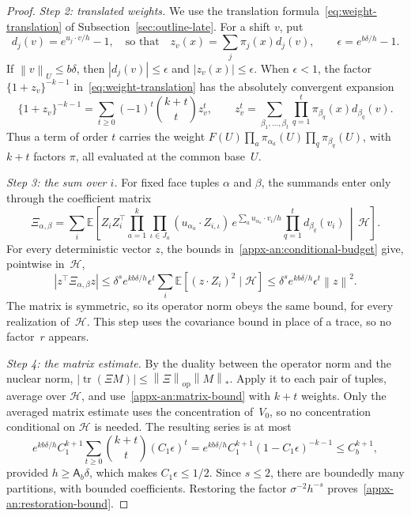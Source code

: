 \documentclass[11pt,letterpaper]{article}
\newif\ifshowrev
\newenvironment{revblock}{\ifshowrev\color{revblue}%
\hypersetup{linkcolor=revblue,citecolor=revblue,urlcolor=revblue}\fi}{}
\newif\ifshowtrim
\newcommand{\trim}[1]{\ifshowtrim{\color{revblue}%
\hypersetup{linkcolor=revblue,citecolor=revblue,urlcolor=revblue}#1}\else#1\fi}
\newcommand{\trs}[1]{\ifshowtrim{\color{revblue}#1}\else#1\fi}
\newif\ifshowskill
\newcommand{\sks}[1]{\ifshowskill{\color{revblue}#1}\else#1\fi}
\theoremstyle{remark}
\newcommand{\E}{\mathbb E}
\newcommand{\tr}{\operatorname{tr}}
\newcommand{\norm}[1]{\left\lVert#1\right\rVert}
\begin{document}
\begin{revblock}
\begin{proof}
\emph{Step 2: translated weights.} \trim{We use the translation
formula~\eqref{eq:weight-translation} of
Subsection~\ref{sec:outline-late}.} For a shift \(v\), put
\[
 d_j(v)=e^{u_j\cdot v/h}-1\trs{,
 \quad\text{so that}\quad} z_v(x)=\sum_j\pi_j(x)d_j(v),
 \qquad \epsilon=e^{b\delta/h}-1.
\]
If \(\norm v_U\le b\delta\), then \(|d_j(v)|\le\epsilon\) and
\(|z_v(x)|\le\epsilon\). When \(\epsilon<1\), the \trim{factor
\(\{1+z_v\}^{-k-1}\) in~\eqref{eq:weight-translation}} has the absolutely
convergent expansion
\[
 \{1+z_v\}^{-k-1}
 =\sum_{\sks{t}\ge0}(-1)^{\sks{t}}\binom{k+\sks{t}}{\sks{t}}z_v^{\sks{t}},
 \qquad
 z_v^{\sks{t}}=\sum_{\beta_1,\ldots,\beta_{\sks{t}}}
                \prod_{q=1}^{\sks{t}}\pi_{\beta_q}(x)d_{\beta_q}(v).
\]
Thus a term of order \(\sks{t}\) carries the weight
\(F(U)\prod_a\pi_{\alpha_a}(U)\prod_q\pi_{\beta_q}(U)\), with \(k+\sks{t}\)
factors \(\pi\), all evaluated at the common base~\(U\).

\emph{Step 3: the sum over \(i\).} For fixed face tuples \(\alpha\) and
\(\beta\), the summands enter only through the coefficient matrix
\[
 \Xi_{\alpha,\beta}=\sum_i\E\left[
  Z_iZ_i^\top
  \prod_{a=1}^k\prod_{\iota\in J_a}(u_{\alpha_a}\cdot Z_{i,\iota})\,
  e^{\sum_a u_{\alpha_a}\cdot v_i/h}
  \prod_{q=1}^{\sks{t}} d_{\beta_q}(v_i)
       \,\middle|\,\mathcal H\right].
\]
For every deterministic vector \(z\), the bounds
in~\eqref{appx-an:conditional-budget} give, pointwise in~\(\mathcal H\),
\[
 |z^\top\Xi_{\alpha,\beta}z|
 \le\delta^se^{kb\delta/h}\epsilon^{\sks{t}}
               \sum_i\E[(z\cdot Z_i)^2\mid\mathcal H]
 \le\delta^se^{kb\delta/h}\epsilon^{\sks{t}}\norm{z}^2.
\]
The matrix is symmetric, so its operator norm obeys the same bound, for
every realization of~\(\mathcal H\). This step uses the covariance
\trim{bound} in place of a trace, so no factor~\(r\) appears.

\emph{Step 4: the matrix estimate.} By the duality between the
operator norm and the nuclear norm,
\(|\tr(\Xi M)|\le\norm{\Xi}_{\mathrm{op}}\norm{M}_*\). Apply it to each
pair of tuples, average over \(\mathcal H\), and
use~\eqref{appx-an:matrix-bound} with \(k+\sks{t}\) weights. Only the
averaged matrix estimate uses the concentration of~\(V_0\), so no
concentration conditional on \(\mathcal H\) is needed. The resulting
series is at most
\[
 e^{kb\delta/h}C_1^{k+1}
 \sum_{\sks{t}\ge0}\binom{k+\sks{t}}{\sks{t}}(C_1\epsilon)^{\sks{t}}
 =e^{kb\delta/h}C_1^{k+1}(1-C_1\epsilon)^{-k-1}
 \le C_b^{k+1},
\]
provided \(h\ge\mathsf A_b\delta\), which makes \(C_1\epsilon\le1/2\).
Since \(s\le2\), there are boundedly many partitions, with bounded
coefficients. Restoring the factor \(\sigma^{-2}h^{-s}\)
proves~\eqref{appx-an:restoration-bound}.


\end{proof}
\end{revblock}
\end{document}
